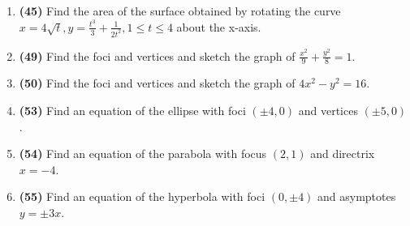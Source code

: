 \documentclass[12pt, a4paper]{article}
\begin{document}
\begin{enumerate}
    \item \textbf{(45)} Find the area of the surface obtained by rotating the curve $x = 4\sqrt{t}, y = \frac{t^3}{3} + \frac{1}{2t^2}, 1 \le t \le 4$ about the x-axis.

    \item \textbf{(49)} Find the foci and vertices and sketch the graph of $\frac{x^2}{9} + \frac{y^2}{8} = 1$.

    \item \textbf{(50)} Find the foci and vertices and sketch the graph of $4x^2 - y^2 = 16$.
    
    \item \textbf{(53)} Find an equation of the ellipse with foci $(\pm 4, 0)$ and vertices $(\pm 5, 0)$.

    \item \textbf{(54)} Find an equation of the parabola with focus $(2, 1)$ and directrix $x = -4$.
    
    \item \textbf{(55)} Find an equation of the hyperbola with foci $(0, \pm 4)$ and asymptotes $y = \pm 3x$.

\end{enumerate}
\end{document}
